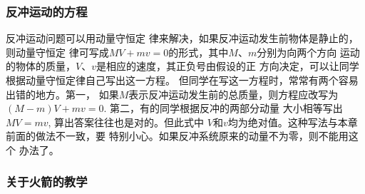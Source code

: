 \subsubsection{反冲运动的方程}

反冲运动问题可以用动量守恒定
律来解决，如果反冲运动发生前物体是静止的，则动量守恒定
律可写成$MV+mv=0$的形式，其中$M$、$m$分别为向两个方向
运动的物体的质量，$V$、$v$是相应的速度，其正负号由假设的正
方向决定，可以让同学根据动量守恒定律自己写出这一方程。
但同学在写这一方程时，常常有两个容易出错的地方。第一，
如果$M$表示反冲运动发生前的总质量，则方程应改写为
$(M-m)V+mv=0$. 第二，有的同学根据反冲的两部分动量
大小相等写出$MV=mv$, 算出答案往往也是对的。但此式中
$V$和$v$均为绝对值。这种写法与本章前面的做法不一致，要
特别小心。如果反冲系统原来的动量不为零，则不能用这个
办法了。

\subsubsection{关于火箭的教学}

